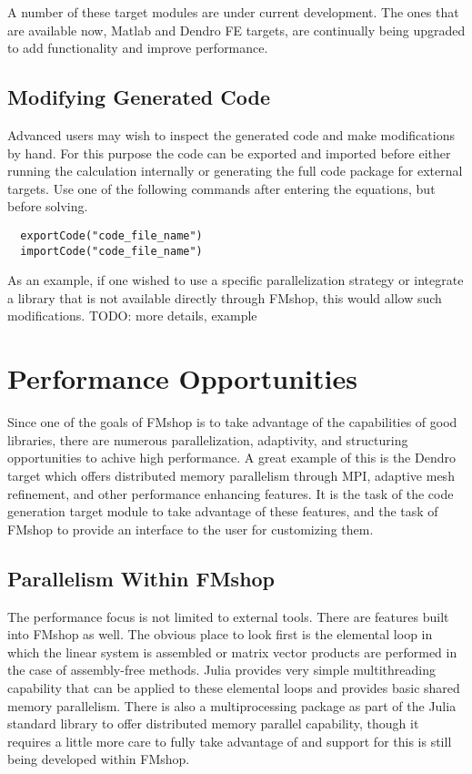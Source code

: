 \documentclass[twoside,leqno,twocolumn]{article}
\begin{document}
A number of these target modules are under current development. The ones that are available now, Matlab and Dendro FE targets, are continually being upgraded to add functionality and improve performance.

\subsection{Modifying Generated Code}
Advanced users may wish to inspect the generated code and make modifications by hand. For this purpose the code can be exported and imported before either running the calculation internally or generating the full code package for external targets. Use one of the following commands after entering the equations, but before solving.
\begin{verbatim}
  exportCode("code_file_name")
  importCode("code_file_name")
\end{verbatim}

As an example, if one wished to use a specific parallelization strategy or integrate a library that is not available directly through FMshop, this would allow such modifications. TODO: more details, example

\section{Performance Opportunities}
Since one of the goals of FMshop is to take advantage of the capabilities of good libraries, there are numerous parallelization, adaptivity, and structuring opportunities to achive high performance. A great example of this is the Dendro target which offers distributed memory parallelism through MPI, adaptive mesh refinement, and other performance enhancing features. It is the task of the code generation target module to take advantage of these features, and the task of FMshop to provide an interface to the user for customizing them.

\subsection{Parallelism Within FMshop}
The performance focus is not limited to external tools. There are features built into FMshop as well. The obvious place to look first is the elemental loop in which the linear system is assembled or matrix vector products are performed in the case of assembly-free methods. Julia provides very simple multithreading capability that can be applied to these elemental loops and provides basic shared memory parallelism. There is also a multiprocessing package as part of the Julia standard library to offer distributed memory parallel capability, though it requires a little more care to fully take advantage of and support for this is still being developed within FMshop. 
\end{document}
